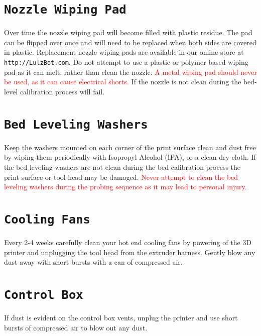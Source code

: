 \section{\texttt{Nozzle Wiping Pad}}
Over time the nozzle wiping pad will become filled with plastic residue. The pad can be flipped over once and will need to be replaced when both sides are covered in plastic. Replacement nozzle wiping pads are available in our online store at \texttt{http://LulzBot.com}. Do not attempt to use a plastic or polymer based wiping pad as it can melt, rather than clean the nozzle. \textcolor{red}{A metal wiping pad should never be used, as it can cause electrical shorts.} If the nozzle is not clean during the bed-level calibration process will fail.

\section{\texttt{Bed Leveling Washers}}
Keep the washers mounted on each corner of the print surface clean and dust free by wiping them periodically with Isopropyl Alcohol (IPA), or a clean dry cloth. If the bed leveling washers are not clean during the bed calibration process the print surface or tool head may be damaged. \textcolor{red}{Never attempt to clean the bed leveling washers during the probing sequence as it may lead to personal injury.}

\section{\texttt{Cooling Fans}}
Every 2-4 weeks carefully clean your hot end cooling fans by powering of the 3D printer and unplugging the tool head from the extruder harness. Gently blow any dust away with short bursts with a can of compressed air. 


\section{\texttt{Control Box}}
If dust is evident on the control box vents, unplug the printer and use short bursts of compressed air to blow out any dust.
